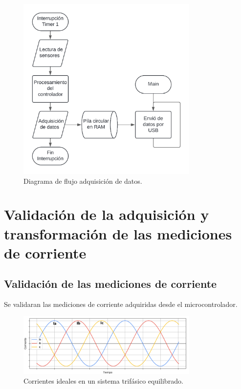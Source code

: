 \documentclass[11pt]{report}
\begin{document}
\begin{figure}[ht]
	\centering
	\includegraphics[width=0.8\textwidth]{imagenes/Debug USB.png}
	\caption{Diagrama de flujo adquisición de datos.}
	\label{flujo_debug}
\end{figure}
\FloatBarrier

\section{Validación de la adquisición y transformación de las mediciones de corriente}

\subsection{Validación de las mediciones de corriente}
Se validaran las mediciones de corriente adquiridas desde el microcontrolador.

\begin{figure}[ht]
	\centering
	\includegraphics[width=0.8\textwidth]{imagenes/Corrientes_ABC_ideal.png}
	\caption{Corrientes ideales en un sistema trifásico equilibrado.}
	\label{corrientes_ABC_ideal}
\end{figure}
\FloatBarrier
\end{document}
